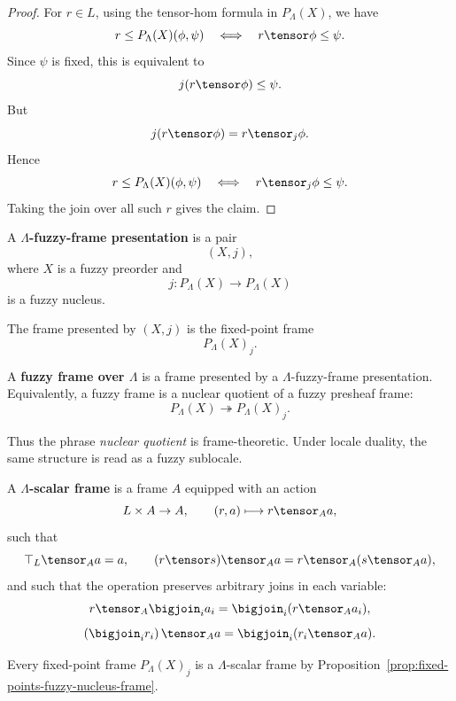 \begin{proof}
For \(r\in L\), using the tensor-hom formula in \(P_\Lambda(X)\), we have
\[
    r\leq P_\Lambda(X)(\phi,\psi)
    \quad\Longleftrightarrow\quad
    r\tensor\phi\leq \psi.
\]
Since \(\psi\) is fixed, this is equivalent to
\[
    j(r\tensor\phi)\leq \psi.
\]
But
\[
    j(r\tensor\phi)=r\tensor_j\phi.
\]
Hence
\[
    r\leq P_\Lambda(X)(\phi,\psi)
    \quad\Longleftrightarrow\quad
    r\tensor_j\phi\leq \psi.
\]
Taking the join over all such \(r\) gives the claim.
\end{proof}

\begin{definition}
\label{def:fuzzy-frame-presentation}
A \textbf{\(\Lambda\)-fuzzy-frame presentation} is a pair
\[
    (X,j),
\]
where \(X\) is a fuzzy preorder and
\[
    j:P_\Lambda(X)\to P_\Lambda(X)
\]
is a fuzzy nucleus.

The frame presented by \((X,j)\) is the fixed-point frame
\[
    P_\Lambda(X)_j.
\]
\end{definition}

\begin{definition}
\label{def:fuzzy-frame}
A \textbf{fuzzy frame over \(\Lambda\)} is a frame presented by a
\(\Lambda\)-fuzzy-frame presentation. Equivalently, a fuzzy frame is a nuclear
quotient of a fuzzy presheaf frame:
\[
    P_\Lambda(X)\twoheadrightarrow P_\Lambda(X)_j.
\]
\end{definition}

Thus the phrase \emph{nuclear quotient} is frame-theoretic. Under locale duality, the
same structure is read as a fuzzy sublocale.

\begin{definition}
\label{def:lambda-scalar-frame}
A \textbf{\(\Lambda\)-scalar frame} is a frame \(A\) equipped with an action
\[
    L\times A\to A,
    \qquad
    (r,a)\longmapsto r\tensor_A a,
\]
such that
\[
    \top_L\tensor_A a=a,
    \qquad
    (r\tensor s)\tensor_A a=r\tensor_A(s\tensor_A a),
\]
and such that the operation preserves arbitrary joins in each variable:
\[
    r\tensor_A\bigjoin_i a_i
    =
    \bigjoin_i(r\tensor_A a_i),
\]
\[
    \left(\bigjoin_i r_i\right)\tensor_A a
    =
    \bigjoin_i(r_i\tensor_A a).
\]
\end{definition}

Every fixed-point frame \(P_\Lambda(X)_j\) is a \(\Lambda\)-scalar frame by
Proposition~\ref{prop:fixed-points-fuzzy-nucleus-frame}.

